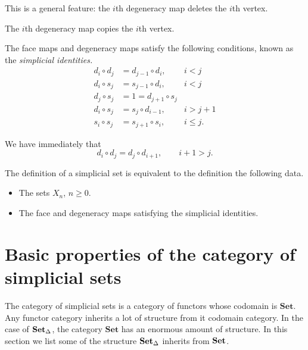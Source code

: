 \documentclass[main.tex]{subfiles}
\begin{document}
This is a general feature: the $i$th degeneracy map deletes the $i$th vertex.



The $i$th degeneracy map copies the $i$th vertex.

\begin{theorem}
  \label{thm:simplicial_identities}
  The face maps and degeneracy maps satisfy the following conditions, known as the \emph{simplicial identities.}
  \begin{align*}
    d_{i} \circ d_{j} &= d_{j - 1} \circ d_{i},&i < j \\
    d_{i} \circ s_{j} &= s_{j-1} \circ d_{i}, &i < j \\
    d_{j} \circ s_{j} &= 1 = d_{j+1} \circ s_{j} \\
    d_{i} \circ s_{j} &= s_{j} \circ d_{i-1}, &i > j + 1 \\
    s_{i} \circ s_{j} &= s_{j+1} \circ s_{i}, &i \leq j.
  \end{align*}
\end{theorem}

\begin{corollary}
  We have immediately that
  \begin{equation*}
    d_{i} \circ d_{j} = d_{j} \circ d_{i+1},\qquad i+1 > j.
  \end{equation*}
\end{corollary}

\begin{fact}
  The definition of a simplicial set is equivalent to the definition the following data.
  \begin{itemize}
    \item The sets $X_{n}$, $n \geq 0$.
    \item The face and degeneracy maps satisfying the simplicial identities.
  \end{itemize}
\end{fact}

\section{Basic properties of the category of simplicial sets}
\label{sec:basic_properties_of_the_category_of_simplicial_sets}

The category of simplicial sets is a category of functors whose codomain is $\mathbf{Set}$. Any functor category inherits a lot of structure from it codomain category. In the case of $\operatorname{\mathbf{Set}_{\Delta}}$, the category $\mathbf{Set}$ has an enormous amount of structure. In this section we list some of the structure $\operatorname{\mathbf{Set}_{\Delta}}$ inherits from $\mathbf{Set}$.
\end{document}
